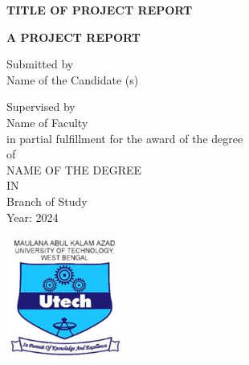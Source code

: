 \documentclass[12pt]{report}
\begin{document}
\begin{titlepage}
\begin{center}
\vspace*{0.5cm}

\textbf{ {\fontsize{18pt}{12pt}\selectfont TITLE OF PROJECT REPORT}}
        
\vspace{0.5cm}
        
\textbf{ {\fontsize{14pt}{12pt}\selectfont A PROJECT REPORT}}

\vspace{1.5cm}

 {\fontsize{14pt}{12pt}\selectfont Submitted by}\\
 \vspace{0.5cm}
 {\fontsize{16pt}{12pt}\selectfont Name of the Candidate (s)
 }\\       
\vspace{1.5cm}

{\fontsize{14pt}{12pt}\selectfont Supervised by}\\
\vspace{0.5cm}
{\fontsize{14pt}{12pt}\selectfont Name of Faculty
}\\
\vspace{0.5cm}
{\fontsize{14pt}{12pt}\selectfont in partial fulfillment for the award of the degree}\\
\vspace{0.5cm}
{\fontsize{14pt}{12pt}\selectfont of}\\
\vspace{0.5cm}
{\fontsize{16pt}{12pt}\selectfont NAME OF THE DEGREE 
}\\
\vspace{0.5cm}
{\fontsize{14pt}{12pt}\selectfont IN}\\
\vspace{0.5cm}
{\fontsize{14pt}{12pt}\selectfont Branch of Study}\\
\vspace{0.5cm}
{\fontsize{14pt}{12pt}\selectfont Year: 2024}\\

\vfill
       
\vspace{0.3cm}
        
\includegraphics[width=0.3\textwidth]{Makaut_logo.jpg}
        

\end{center}
\end{titlepage}
\end{document}
